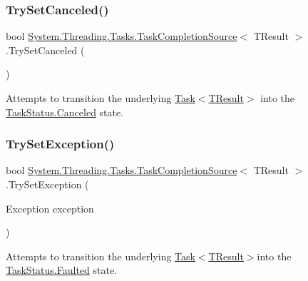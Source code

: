 \subsubsection{\texorpdfstring{Try\+Set\+Canceled()}{TrySetCanceled()}}
{\footnotesize\ttfamily bool \hyperlink{class_system_1_1_threading_1_1_tasks_1_1_task_completion_source}{System.\+Threading.\+Tasks.\+Task\+Completion\+Source}$<$ T\+Result $>$.Try\+Set\+Canceled (\begin{DoxyParamCaption}{ }\end{DoxyParamCaption})}



Attempts to transition the underlying \hyperlink{class_system_1_1_threading_1_1_tasks_1_1_task}{Task$<$\+T\+Result$>$} into the \hyperlink{namespace_system_1_1_threading_1_1_tasks_a60ab70a6c84627853d6b1056f1edebcfa0e22fe7d45f8e5632a4abf369b24e29c}{Task\+Status.\+Canceled} state. 

\mbox{\label{class_system_1_1_threading_1_1_tasks_1_1_task_completion_source_a1a154209ebd190f5e9d2bff149ed3a6b}} 
\subsubsection{\texorpdfstring{Try\+Set\+Exception()}{TrySetException()}}
{\footnotesize\ttfamily bool \hyperlink{class_system_1_1_threading_1_1_tasks_1_1_task_completion_source}{System.\+Threading.\+Tasks.\+Task\+Completion\+Source}$<$ T\+Result $>$.Try\+Set\+Exception (\begin{DoxyParamCaption}\item[{Exception}]{exception }\end{DoxyParamCaption})}



Attempts to transition the underlying \hyperlink{class_system_1_1_threading_1_1_tasks_1_1_task}{Task$<$\+T\+Result$>$}into the \hyperlink{namespace_system_1_1_threading_1_1_tasks_a60ab70a6c84627853d6b1056f1edebcfa2b310d05c23325e2935ec87b25a60b8f}{Task\+Status.\+Faulted} state. 

\mbox{\label{class_system_1_1_threading_1_1_tasks_1_1_task_completion_source_a72372c2eee59e4221bd2f7c856046aff}} 
